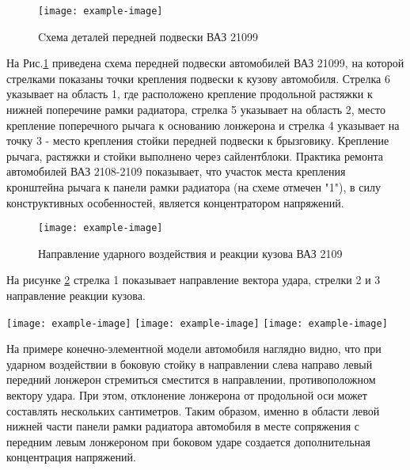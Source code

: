 \begin{figure}[H]
 	\centering
 	\texttt{[image: example-image]}
 	\caption{{\footnotesize {Cхема деталей передней подвески ВАЗ 21099}}}
 	\label{ris:images/s1}
 \end{figure}

На Рис.\ref{ris:images/s1} приведена схема передней подвески автомобилей ВАЗ 21099, на которой стрелками показаны точки крепления подвески к кузову автомобиля.  Стрелка 6 указывает на область 1, где расположено крепление продольной растяжки к нижней поперечине рамки радиатора, стрелка 5 указывает на  область 2, место крепление поперечного рычага к основанию лонжерона и стрелка 4 указывает на точку 3 - место крепления стойки передней подвески к брызговику. Крепление рычага, растяжки и стойки выполнено через сайлентблоки. Практика ремонта автомобилей ВАЗ 2108-2109 показывает, что участок места крепления кронштейна рычага к панели рамки радиатора (на схеме отмечен "1"), в силу конструктивных особенностей, является  концентратором напряжений. 

 \begin{figure}[H]
	\centering
	\texttt{[image: example-image]}
	\caption{{\footnotesize {Направление   ударного воздействия  и реакции кузова ВАЗ 2109}}}
	\label{ris:images/s2}
\end{figure}

На рисунке \ref{ris:images/s2}  стрелка 1 показывает направление  вектора удара, стрелки 2 и 3 направление реакции кузова.

\pagebreak

\begin{multicols}{3}[\columnsep=1cm]
\noindent	\texttt{[image: example-image]}
	\columnbreak
	\texttt{[image: example-image]}
	\columnbreak
	\texttt{[image: example-image]}
\end{multicols}


  \vspace{3mm}

На примере конечно-элементной модели автомобиля  наглядно видно, что при  ударном воздействии в боковую стойку в направлении слева направо левый передний лонжерон стремиться сместится в направлении, противоположном вектору удара. При этом, отклонение лонжерона от продольной оси может составлять нескольких сантиметров. Таким образом, именно в области левой нижней части панели рамки радиатора автомобиля  в месте сопряжения с передним левым лонжероном при боковом ударе создается дополнительная  концентрация напряжений.

